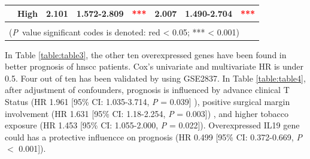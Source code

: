 \documentclass[jpm,article,submit,moreauthors,pdftex]{Definitions/mdpi}
\begin{document}
\begin{table}[hp]
{\begin{tabular}{|l|l|l|l|l|l|l|l|}
\cline{2-8}
                                        & High                                                                                & 2.101                                                                          & 1.572-2.809                                                                   & \multicolumn{1}{c|}{\textcolor{red}{***}}                                     & 2.007                                                                          & 1.490-2.704                                                                   & \multicolumn{1}{c|}{\textcolor{red}{***}}                                      \\ 
\hline
\multicolumn{8}{|l|}{}                                                                                                                                                                                                                                                                                                                                                                                                                                                                                                                                                                                                           \\ 
\hline
\multicolumn{8}{|l|}{(\textit{P}~value significant codes is denoted: red \textless{} 0.05; *** \textless{} 0.001)}                                                                                                                                                                                                                                                                                                                                                                                                                                                                                                               \\
\hline
\end{tabular}
} %
{}
\label{table:table2}
\end{table}




In Table \ref{table:table3}, the other ten overexpressed genes have been found in better prognosis of \acrshort{hnscc} patients. Cox's univariate and multivariate HR is under 0.5.
Four out of ten has been validated by using GSE2837.
In Table \ref{table:table4},
after adjustment of confounders, prognosis is influenced by advance clinical T Status (HR 1.961 [95\% CI: 1.035-3.714, \textit{P} = 0.039] ), positive surgical margin involvement (HR 1.631 [95\% CI: 1.18-2.254, \textit{P} = 0.003]) , and higher tobacco exposure (HR 1.453 [95\% CI: 1.055-2.000, \textit{P} = 0.022]).
Overexpressed \acrshort{IL19} gene could has a protective influencce on prognosis (HR 0.499 [95\% CI: 0.372-0.669, \textit{P} $<$ 0.001]).
\end{document}
